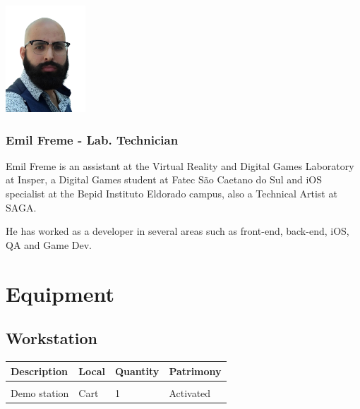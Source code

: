 \begin{multicols}{2}
\includegraphics[width=3cm]{imgs/emil-freme.png}
\columnbreak
\subsubsection{Emil Freme - Lab. Technician}
Emil Freme is an assistant at the Virtual Reality and Digital Games Laboratory at Insper, a Digital Games student at Fatec São Caetano do Sul and iOS specialist at the Bepid Instituto Eldorado campus, also a Technical Artist at SAGA.

He has worked as a developer in several areas such as front-end, back-end, iOS, QA and Game Dev.


\end{multicols}

\newpage
\section{Equipment}
\setlength{\columnsep}{0.5cm}
\subsection{Workstation}
\begin{tabularx}{\textwidth}{ Y  Y  Y  Y }
    \textbf{Description} &  \textbf{Local} &  \textbf{Quantity} & \textbf{Patrimony}\\
    \hline \\
     Demo station & Cart & 1 & Activated
\end{tabularx}
\vspace{1cm}

